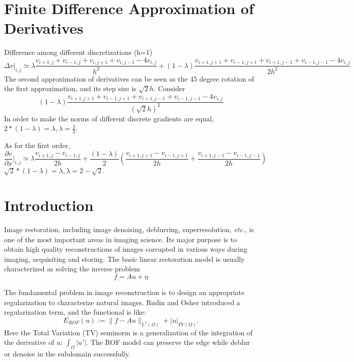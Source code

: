 \documentclass{article}
\title{\showtitle}
\author{\showauthor}
\begin{document}
\maketitle
\thispagestyle{fancy}

\section{Finite Difference Approximation of Derivatives}

Difference among different discretizations (h=1)
\begin{equation}\nonumber
\Delta v|_{i,j}\simeq \lambda \frac{v_{i+1,j}+v_{i-1,j}+v_{i,j+1}+v_{i,j-1}-4v_{i,j}}{h^2}+(1-\lambda) \frac{v_{i+1,j+1}+v_{i-1,j+1}+v_{i+1,j-1}+v_{i-1,j-1}-4v_{i,j}}{2h^2}
\end{equation}
The second approximation of derivatives can be seen as the 45 degree rotation of the first approximation, and its step size is $\sqrt{2} h$. Consider
\begin{equation}\nonumber
(1-\lambda)\frac{v_{i+1,j+1}+v_{i-1,j+1}+v_{i+1,j-1}+v_{i-1,j-1}-4v_{i,j}}{{(\sqrt{2} h)}^2}
\end{equation}
In order to make the norms of different discrete gradients are equal, $2*(1-\lambda)=\lambda, \lambda = \frac{2}{3}$.
 
As for the first order,
\begin{equation}\nonumber
\frac{\partial v}{\partial x}|_{i,j}\simeq \lambda \frac{v_{i+1,j}-v_{i-1,j}}{2h}+\frac{(1-\lambda)}{2} (\frac{v_{i+1,j+1}-v_{i-1,j+1}}{2h}+\frac{v_{i+1,j-1}-v_{i-1,j-1}}{2h})
\end{equation}
$\sqrt{2}*(1-\lambda)=\lambda, \lambda = 2-\sqrt{2}$.

\section{Introduction}

Image restoration, including image denoising, deblurring, superresolution,
\emph{etc.}, is one of the most important areas in imaging science.
Its major purpose is to obtain high quality reconstructions of images
corrupted in various ways during imaging, acquisiting and storing.
The basic linear restoration model is usually characterized as solving the inverse problem
\begin{equation}
f = Au+\eta
\end{equation}

The  fundamental problem in image reconstruction is to design an appropriate regularization to characterize natural images. Rudin and Osher introduced a regularization term, and the functional is like:
\begin{equation}
E_{ROF}(u) := \|f-Au\|_{L^2(\Omega)} + |u|_{TV(\Omega)}. 
\end{equation}
Here the Total Variation (TV) seminorm is a generalization of the integration of the derivative of $u$: $\int_{\Omega}|u'|$. The ROF model can preserve the edge while deblur or denoise in the subdomain successfully. 
\end{document}
